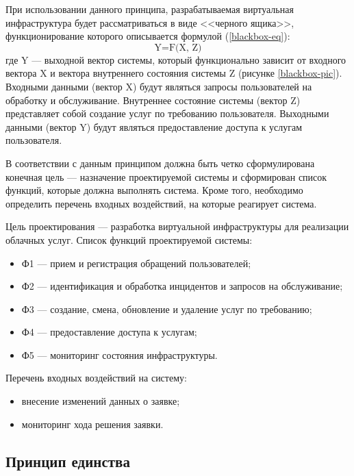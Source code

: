 При использовании данного принципа, разрабатываемая виртуальная инфраструктура будет рассматриваться в виде <<черного ящика>>, функционирование которого описывается формулой (\ref{blackbox-eq}):
\begin{equation} \label{blackbox-eq}
\text{Y=F(X, Z)}
\end{equation}
где Y --- выходной вектор системы, который функционально зависит от входного вектора X и вектора внутреннего состояния системы Z (рисунке \ref{blackbox-pic}).
Входными данными (вектор X) будут являться запросы пользователей на обработку и обслуживание.
Внутреннее состояние системы (вектор Z) представляет собой создание услуг по требованию пользователя.
Выходными данными (вектор Y) будут являться предоставление доступа к услугам пользователя.

В соответствии с данным принципом должна быть четко сформулирована конечная цель --- назначение проектируемой системы и сформирован список функций, которые должна выполнять система.
Кроме того, необходимо определить перечень входных воздействий, на которые реагирует система.

Цель проектирования --- разработка виртуальной инфраструктуры для реализации облачных услуг.
Список функций проектируемой системы:
\begin{itemize}
  \item Ф1 --- прием и регистрация обращений пользователей;
  \item Ф2 --- идентификация и обработка инцидентов и запросов на обслуживание;
  \item Ф3 --- создание, смена, обновление и удаление услуг по требованию;
  \item Ф4 --- предоставление доступа к услугам;
  \item Ф5 --- мониторинг состояния инфраструктуры.
\end{itemize}

Перечень входных воздействий на систему:
\begin{itemize}
  \item внесение изменений данных о заявке;
  \item мониторинг хода решения заявки.
\end{itemize}

\subsection{Принцип единства}


